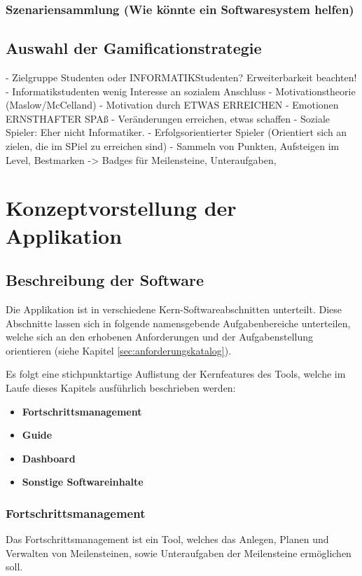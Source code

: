 \documentclass{scrreprt}
\begin{document}
\subsection{Szenariensammlung (Wie könnte ein Softwaresystem helfen)}


\section{Auswahl der Gamificationstrategie}
- Zielgruppe Studenten oder INFORMATIKStudenten? Erweiterbarkeit beachten!
- Informatikstudenten wenig Interesse an sozialem Anschluss
- Motivationstheorie (Maslow/McCelland) 
- Motivation durch ETWAS ERREICHEN
- Emotionen ERNSTHAFTER SPAß - Veränderungen erreichen, etwas schaffen
- Soziale Spieler: Eher nicht Informatiker. 
- Erfolgsorientierter Spieler (Orientiert sich an zielen, die im SPiel zu erreichen sind)
- Sammeln von Punkten, Aufsteigen im Level, Bestmarken
-> Badges für Meilensteine, Unteraufgaben, 


\chapter{Konzeptvorstellung der Applikation} \label{chap:konzept}

\section{Beschreibung der Software}
\par Die Applikation ist in verschiedene Kern-Softwareabschnitten unterteilt. Diese Abschnitte lassen sich in folgende namensgebende Aufgabenbereiche unterteilen, welche sich an den erhobenen Anforderungen und der Aufgabenstellung orientieren (siehe Kapitel \ref{sec:anforderungskatalog}).\\

\par Es folgt eine stichpunktartige Auflistung der Kernfeatures des Tools, welche im Laufe dieses Kapitels ausführlich beschrieben werden:

\begin{itemize}
\item \textbf{Fortschrittsmanagement}
\item \textbf{Guide}
\item \textbf{Dashboard}
\item \textbf{Sonstige Softwareinhalte}
\end{itemize}

\subsection{Fortschrittsmanagement}
Das Fortschrittsmanagement ist ein Tool, welches das Anlegen, Planen und Verwalten von Meilensteinen, sowie Unteraufgaben der Meilensteine ermöglichen soll. 
\end{document}
